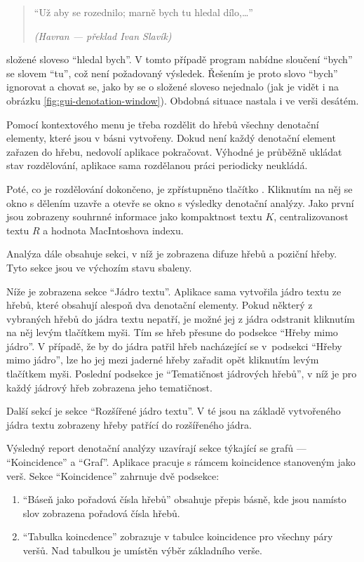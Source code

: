 \documentclass[dp.tex]{subfiles}
\begin{document}
\begin{description}[style=nextline]
		\begin{verse}
		\enquote{Už aby se rozednilo; marně bych tu hledal dílo,\ldots}
		\begin{flushright}
		\textit{(Havran --- překlad Ivan Slavík)}
		\end{flushright}
		\end{verse}

	složené sloveso \enquote{hledal bych}. V tomto případě program nabídne sloučení \enquote{bych} se slovem \enquote{tu}, což není požadovaný výsledek. Řešením je proto slovo \enquote{bych} ignorovat a chovat se, jako by se o složené sloveso nejednalo (jak je vidět i na obrázku \ref{fig:gui-denotation-window}). Obdobná situace nastala i ve verši desátém.
\end{description}

Pomocí kontextového menu je třeba rozdělit do hřebů všechny denotační elementy, které jsou v básni vytvořeny. Dokud není každý denotační element zařazen do hřebu, nedovolí aplikace pokračovat. Výhodné je průběžně ukládat stav rozdělování, aplikace sama rozdělanou práci periodicky neukládá.

Poté, co je rozdělování dokončeno, je zpřístupněno tlačítko . Kliknutím na něj se okno s dělením uzavře a otevře se okno s výsledky denotační analýzy. Jako první jsou zobrazeny souhrnné informace jako kompaktnost textu $K$, centralizovanost textu $R$ a hodnota MacIntoshova indexu.

Analýza dále obsahuje sekci, v níž je zobrazena difuze hřebů a poziční hřeby. Tyto sekce jsou ve výchozím stavu sbaleny.

Níže je zobrazena sekce \enquote{Jádro textu}. Aplikace sama vytvořila jádro textu ze hřebů, které obsahují alespoň dva denotační elementy. Pokud některý z vybraných hřebů do jádra textu nepatří, je možné jej z jádra odstranit kliknutím na něj levým tlačítkem myši. Tím se hřeb přesune do podsekce \enquote{Hřeby mimo jádro}. V případě, že by do jádra patřil hřeb nacházející se v~podsekci \enquote{Hřeby mimo jádro}, lze ho jej mezi jaderné hřeby zařadit opět kliknutím levým tlačítkem myši. Poslední podsekce je \enquote{Tematičnost jádrových hřebů}, v níž je pro každý jádrový hřeb zobrazena jeho tematičnost. 

Další sekcí je sekce \enquote{Rozšířené jádro textu}. V té jsou na základě vytvořeného jádra textu zobrazeny hřeby patřící do rozšířeného jádra.

Výsledný report denotační analýzy uzavírají sekce týkající se grafů --- \enquote{Koincidence} a \enquote{Graf}. Aplikace pracuje s rámcem koincidence stanoveným jako verš. Sekce \enquote{Koincidence} zahrnuje dvě podsekce:
\begin{enumerate}
\item \enquote{Báseň jako pořadová čísla hřebů} obsahuje přepis básně, kde jsou namísto slov zobrazena pořadová čísla hřebů. 
\item \enquote{Tabulka koincdence} zobrazuje v tabulce koincidence pro všechny páry veršů. Nad tabulkou je umístěn výběr základního verše.
\end{enumerate}
\end{document}

